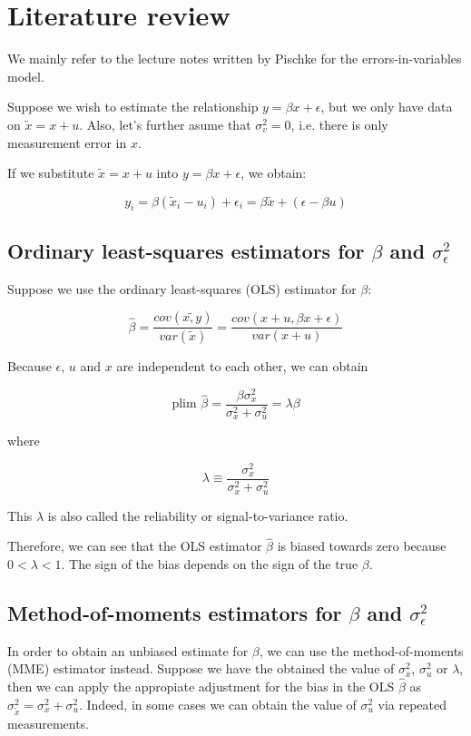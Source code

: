 \documentclass{article}
\begin{document}
\section{Literature review}

We mainly refer to the lecture notes written by Pischke \cite{lecturenotes} for the errors-in-variables model. 

Suppose we wish to estimate the relationship $y = \beta x + \epsilon$, but we only have data on $\tilde{x} = x + u$. Also, let's further asume that $\sigma_v^2 = 0$, i.e. there is only measurement error in $x$.

If we substitute $\tilde{x} = x+u$ into $y = \beta x + \epsilon$, we obtain:

\[
    y_i = \beta(\tilde{x}_i - u_i) + \epsilon_i = \beta \tilde{x} + (\epsilon - \beta u)
\]

\subsection{Ordinary least-squares estimators for $\beta$ and $\sigma_\epsilon^2$}

Suppose we use the ordinary least-squares (OLS) estimator for $\beta$:

\[
\hat{\beta} = \frac{cov(\tilde{x, y})}{var(\tilde{x})} = \frac{cov(x+u, \beta x + \epsilon)}{var(x + u)}
\]

Because $\epsilon$, $u$ and $x$ are independent to each other, we can obtain

\[
\textrm{plim } \hat{\beta} = \frac{\beta \sigma^2_x}{\sigma^2_x + \sigma^2_u} = \lambda \beta
\]

where

\[
\lambda \equiv \frac{\sigma_x^2}{\sigma_x^2 + \sigma_u^2}
\]

This $\lambda$ is also called the reliability or signal-to-variance ratio.

Therefore, we can see that the OLS estimator $\hat{\beta}$ is biased towards zero because $0 < \lambda < 1$. The sign of the bias depends on the sign of the true $\beta$.

\subsection{Method-of-moments estimators for $\beta$ and $\sigma_\epsilon^2$}

In order to obtain an unbiased estimate for $\beta$, we can use the method-of-moments (MME) estimator instead. Suppose we have the obtained the value of $\sigma_x^2$, $\sigma_u^2$ or $\lambda$, then we can apply the appropiate adjustment for the bias in the OLS $\hat{\beta}$ as $\sigma^2_{\tilde{x}} = \sigma^2_x + \sigma^2_u$. Indeed, in some cases we can obtain the value of $\sigma_u^2$ via repeated measurements.
\end{document}
